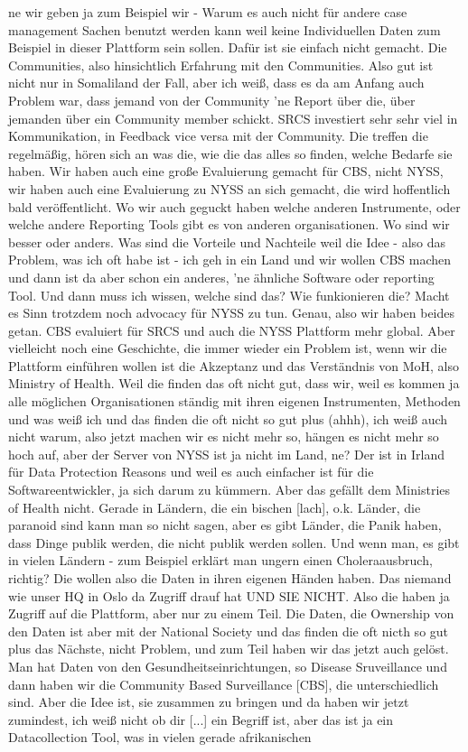 ne wir geben ja zum Beispiel wir - Warum es auch nicht f{\"u}r andere case management Sachen benutzt werden kann weil keine Individuellen Daten zum Beispiel in dieser Plattform sein sollen. Daf{\"u}r ist sie einfach nicht gemacht. Die Communities, also hinsichtlich Erfahrung mit den Communities. Also gut ist nicht nur in Somaliland der Fall, aber ich weiß, dass es da am Anfang auch Problem war, dass jemand von der Community 'ne Report {\"u}ber die, {\"u}ber jemanden {\"u}ber ein Community member schickt. SRCS investiert sehr sehr viel in Kommunikation, in Feedback vice versa mit der Community. Die treffen die regelm{\"a}ßig, h{\"o}ren sich an was die, wie die das alles so finden, welche Bedarfe sie haben. Wir haben auch eine große Evaluierung gemacht f{\"u}r CBS, nicht NYSS, wir haben auch eine Evaluierung zu NYSS an sich gemacht, die wird hoffentlich bald ver{\"o}ffentlicht. Wo wir auch geguckt haben welche anderen Instrumente, oder welche andere Reporting Tools gibt es von anderen organisationen. Wo sind wir besser oder anders. Was sind die Vorteile und Nachteile weil die Idee - also das Problem, was ich oft habe ist - ich geh in ein Land und wir wollen CBS machen und dann ist da aber schon ein anderes, 'ne {\"a}hnliche Software oder reporting Tool. Und dann muss ich wissen, welche sind das? Wie funkionieren die? Macht es Sinn trotzdem noch advocacy f{\"u}r NYSS zu tun. Genau, also wir haben beides getan. CBS evaluiert f{\"u}r SRCS und auch die NYSS Plattform mehr global. Aber vielleicht noch eine Geschichte, die immer wieder ein Problem ist, wenn wir die Plattform einf{\"u}hren wollen ist die Akzeptanz und das Verst{\"a}ndnis von MoH, also Ministry of Health. Weil die finden das oft nicht gut, dass wir, weil es kommen ja alle m{\"o}glichen Organisationen st{\"a}ndig mit ihren eigenen Instrumenten, Methoden und was weiß ich und das finden die oft nicht so gut plus (ahhh), ich weiß auch nicht warum, also jetzt machen wir es nicht mehr so, h{\"a}ngen es nicht mehr so hoch auf, aber der Server von NYSS ist ja nicht im Land, ne? Der ist in Irland f{\"u}r Data Protection Reasons und weil es auch einfacher ist f{\"u}r die Softwareentwickler, ja sich darum zu k{\"u}mmern. Aber das gef{\"a}llt dem Ministries of Health nicht. Gerade in L{\"a}ndern, die ein bischen [lach], o.k. L{\"a}nder, die paranoid sind kann man so nicht sagen, aber es gibt L{\"a}nder, die Panik haben, dass Dinge publik werden, die nicht publik werden sollen. Und wenn man, es gibt in vielen L{\"a}ndern - zum Beispiel erkl{\"a}rt man ungern einen Choleraausbruch, richtig? Die wollen also die Daten in ihren eigenen H{\"a}nden haben. Das niemand wie unser HQ in Oslo da Zugriff drauf hat UND SIE NICHT. Also die haben ja Zugriff auf die Plattform, aber nur zu einem Teil. Die Daten, die Ownership von den Daten ist aber mit der National Society und das finden die oft nicth so gut plus das N{\"a}chste, nicht Problem, und zum Teil haben wir das jetzt auch gel{\"o}st. Man hat Daten von den Gesundheitseinrichtungen, so Disease Sruveillance und dann haben wir die Community Based Surveillance [CBS], die unterschiedlich sind. Aber die Idee ist, sie zusammen zu bringen und da haben wir jetzt zumindest, ich weiß nicht ob dir [...] ein Begriff ist, aber das ist ja ein Datacollection Tool, was in vielen gerade afrikanischen 